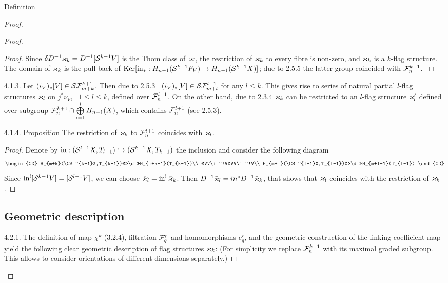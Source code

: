 \documentclass{article}
\begin{document}
\begin{subsubsection}{ Definition}
\begin{proof}
{\begin{proof}
{\begin{proof}
{Since $\delta D^{-1}\bar{\varkappa}_k=D^{-1}[\mathcal S^{k-1}V]$ is the Thom class of $\operatorname{pr}$,
the restriction of $\varkappa_k$ to every fibre is non-zero, and $\varkappa_k$ is a
$k$-flag structure. The domain of $\varkappa_k$ is the pull back of
$\operatorname{Ker}[\operatorname{in}_*:H_{n-1}(\mathcal S^{k-1}F_V)\to H_{n-1}(\mathcal S^{k-1}X)]$;
due to 2.5.5 the latter group coincided with $\mathcal F_n^{k+1}$. 
}\end{proof}
4.1.3. Let $(i_V)_*[V]\in\mathcal S\mathcal F_{m+k}^{k+1}$. Then due to 2.5.3 \
$(i_V)_*[V]\in\mathcal S\mathcal F_{m+l}^{l+1}$ for any $l\le k$. This gives rise to series of
natural partial $l$-flag structures $\varkappa_l$ on $j^*\nu_V$, \ $1\le l\le k$,
defined over $\mathcal F_n^{l+1}$. On the other hand, due to 2.3.4 $\varkappa_k$ can be
restricted to an $l$-flag structure $\varkappa_l^\prime$ defined
over subgroup $\mathcal F_n^{k+1}\cap\bigoplus\limits_{i=1}^l H_{n-1}(X)$,
which contains $\mathcal F_n^{l+1}$ (see 2.5.3).
\begin{proclaim}{ {4.1.4. Proposition} The restriction of
$\varkappa_k$ to $\mathcal F_n^{l+1}$ coincides with $\varkappa_l$.
}\end{proclaim}
\begin{proof}
Denote by $\operatorname{in}:(\mathcal S^{l-1}X, T_{l-1})\hookrightarrow(\mathcal S^{k-1}X,T_{k-1})$ the inclusion
and consider the following diagram
$$\begin{CD}
H_{m+k}(\CS^{k-1}X,T_{k-1})@>\d>>H_{m+k-1}(T_{k-1})\\
@VV\i^!V@VV\i^!V\\
H_{m+l}(\CS^{l-1}X,T_{l-1})@>\d>>H_{m+l-1}(T_{l-1})
\end{CD}
$$
Since $\operatorname{in}^![\mathcal S^{k-1}V]=[\mathcal S^{l-1}V]$, we can choose $\bar{\varkappa}_l=\operatorname{in}^!\bar{\varkappa}_k$.
Then $D^{-1}\bar{\varkappa}_l=in^*D^{-1}\bar{\varkappa}_k$, that shows that $\varkappa_l$ coincides with
the restriction of $\varkappa_k$. 
\end{proof}
\subsection{Geometric description }

4.2.1. The definition of map $\chi^k$ (3.2.4), filtration $\mathcal F_q^r$ and
homomorphisms $e_q^r$, and the geometric construction of the linking
coefficient map yield the following clear geometric description of flag
structures $\varkappa_k$: (For simplicity we replace $\mathcal F_n^{k+1}$ with its maximal
graded subgroup. This allows to consider orientations of different dimensions
separately.)

}
\end{proof}}
\end{proof}
\end{subsubsection}
\end{document}
